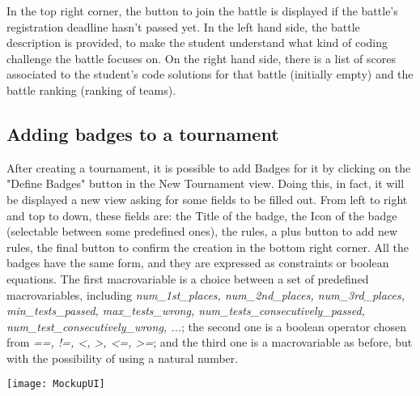 In the top right corner, the button to join the battle is displayed if the battle's registration deadline hasn't passed yet. 
In the left hand side, the battle description is provided, to make the student understand what kind of coding challenge the battle focuses on. On the right hand side, there is a list of scores associated to the student's code solutions for that battle (initially empty) and the battle ranking (ranking of teams).

\begin{minipage}{\linewidth}
	\subsection{Adding badges to a tournament}
	After creating a tournament, it is possible to add Badges for it by clicking on the "Define Badges" button in the New Tournament view. Doing this, in fact, it will be displayed a new view asking for some fields to be filled out.
	From left to right and top to down, these fields are: the Title of the badge, the Icon of the badge (selectable between some predefined ones), the rules, a plus button to add new rules, the final button to confirm the creation in the bottom right corner.
	All the badges have the same form, and they are expressed as constraints or boolean equations. The first macrovariable is a choice between a set of predefined macrovariables, including \textit{num_1st_places, num_2nd_places, num_3rd_places, min_tests_passed, max_tests_wrong, num_tests_consecutively_passed, num_test_consecutively_wrong, ...}; the second one is a boolean operator chosen from \textit{==, !=, <, >, <=, >=}; and the third one is a macrovariable as before, but with the possibility of using a natural number.
	\begin{center}
		\texttt{[image: MockupUI]}
	\end{center}
	
\end{minipage}